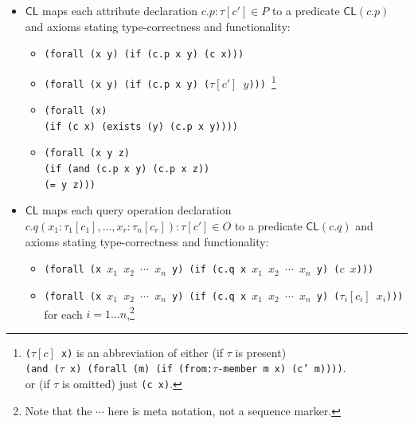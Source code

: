 \documentclass[10pt,fleqn,final]{scrreprt}
\newcommand*{\CL}{\ensuremath{\mathsf{CL}}\xspace}
\newenvironment{definitions}[0]{\medskip }{}
\newcommand{\white}[1]{{\color{white}{#1}}}
\newcommand{\qqquad}{\white{x}\qquad}
\begin{document}
\begin{definitions}
\begin{itemize}
  \item $\CL$ maps each attribute declaration $c.p : \tau[c'] \in P$ to a predicate $\CL(c.p)$ and axioms stating type-correctness
and functionality:
\begin{itemize}
\item
\texttt{(forall (x y) (if (c.p x y) (c x))) }
\item 
\texttt{(forall (x y) (if (c.p x y) ($\tau[c']$ $y$))) }\footnote
{ \texttt{($\tau[c]$ x)} is an abbreviation of either (if $\tau$ is present)\\
\texttt{(and ($\tau$ x) (forall (m) (if (from:$\tau$-member m x) (c' m))))}.\\
or (if $\tau$ is omitted) just \texttt{(c x)}.}
\item 
\texttt{(forall (x)\\
\qqquad  (if (c x) (exists (y) (c.p x y))))}
\item 
\texttt{(forall (x y z)}\\
\qqquad \texttt{(if (and (c.p x y) (c.p x z))}\\
\qqquad\qqquad\texttt{(= y z)))}
\end{itemize}
  \item $\CL$ maps each query operation declaration $c.q(x_1 :
    \tau_1[c_1], \dots, x_r : \tau_n[c_r]) : \tau[c'] \in O$ to a
    predicate $\CL(c.q)$ and axioms stating type-correctness and
    functionality:
\begin{itemize}
\item
\texttt{(forall (x $x_1$ $x_2$ $\cdots$  $x_n$ y) (if (c.q x $x_1$ $x_2$ $\cdots$  $x_n$ y) ($c$ $x$))) }
\item 
\texttt{(forall (x $x_1$ $x_2$ $\cdots$  $x_n$ y) (if (c.q x $x_1$ $x_2$ $\cdots$  $x_n$ y) ($\tau_i[c_i]$ $x_i$))) }
for each $i=1\ldots n$,\footnote{Note that the $\cdots$ here is meta notation, not a sequence marker.}

\end{itemize}
\end{itemize}
\end{definitions}
\end{document}
